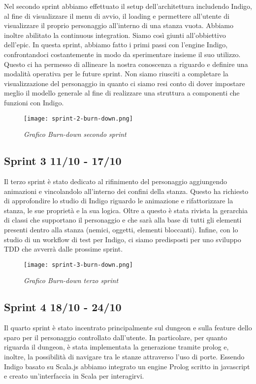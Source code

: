 Nel secondo sprint abbiamo effettuato il setup dell'architettura includendo Indigo, al fine di visualizzare il menu di avvio, il loading e permettere all'utente di visualizzare il proprio personaggio all'interno di una stanza vuota. 
Abbiamo inoltre abilitato la continuous integration. Siamo così giunti all'obbiettivo dell'epic. In questa sprint, abbiamo fatto i primi passi con l'engine Indigo, confrontandoci costantemente in modo da sperimentare insieme il suo utilizzo. Questo ci ha permesso di allineare la nostra conoscenza a riguardo e definire una modalità operativa per le future sprint. 
Non siamo riusciti a completare la visualizzazione del personaggio in quanto ci siamo resi conto di dover impostare meglio il modello generale al fine di realizzare una struttura a componenti che funzioni con Indigo.

\begin{figure}[!hbt]
    \centering
    \texttt{[image: sprint-2-burn-down.png]}
    \caption{\textit{Grafico Burn-down secondo sprint}} 
\end{figure}


\subsection{Sprint 3 11/10 - 17/10}

Il terzo sprint è stato dedicato al rifinimento del personaggio aggiungendo animazioni e vincolandolo all'interno dei confini della stanza. 
Questo ha richiesto di approfondire lo studio di Indigo riguardo le animazione e rifattorizzare la stanza, le sue proprietà e la sua logica. 
Oltre a questo è stata rivista la gerarchia di classi che supportano il personaggio e che sarà alla base di tutti gli elementi presenti dentro alla stanza (nemici, oggetti, elementi bloccanti).
Infine, con lo studio di un workflow di test per Indigo, ci siamo predisposti per uno sviluppo TDD che avverrà dalle prossime sprint.


\begin{figure}[!hbt]
    \centering
    \texttt{[image: sprint-3-burn-down.png]}
    \caption{\textit{Grafico Burn-down terzo sprint}} 
\end{figure}

\subsection{Sprint 4 18/10 - 24/10}
Il quarto sprint è stato incentrato principalmente sul dungeon e sulla feature dello sparo per il personaggio controllato dall'utente. 
In particolare, per quanto riguarda il dungeon, è stata implementata la generazione tramite prolog e, inoltre, la possibilità di navigare tra le stanze attraverso l'uso di porte. 
Essendo Indigo basato su Scala.js abbiamo integrato un engine Prolog scritto in javascript e creato un'interfaccia in Scala per interagirvi.

